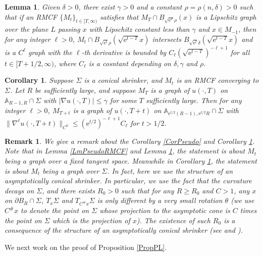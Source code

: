 \documentclass[12pt]{amsart}
\numberwithin{equation}{section}
\newtheorem{lemma}[theorem]{Lemma}
\newtheorem{remark}[theorem]{Remark}
\newtheorem{corollary}[theorem]{Corollary}
\numberwithin{equation}{section}
\begin{document}
	\begin{lemma}\label{LmPseudoRMCF-high}
		Given $\delta>0$, there exist $\gamma>0$ and a constant $\rho=\rho(n,\delta)>0$ such that if an RMCF $\{M_t\}_{t\in[T,\infty)}$ satisfies that $M_{T}\cap B_{\sqrt{\mathrm{e}^T}\rho}(x)$ is a Lipschitz graph over the plane $L$ passing $x$ with Lipschitz constant less than $\gamma$ and $x\in M_{-1}$, then for any integer $\ell>0$, $M_t \cap B_{\sqrt{\mathrm{e}^t}\rho}(\sqrt{\mathrm{e}^{t-T}}x)$ intersects $B_{\sqrt{\mathrm{e}^t}\delta}(\sqrt{\mathrm{e}^{t-T}}x)$ and is a $C^\ell$ graph with the $\ell$-th derivative is bounded by $C_\ell(\sqrt{\mathrm{e}^{t-T}})^{-\ell+1}$ for all $t\in[T+1/2,\infty)$, where $C_\ell$ is a cosntant depending on $\delta,\gamma$ and $\rho$.
	\end{lemma}
	\begin{corollary}\label{CorPseudo-high}
		Suppose $\Sigma$ is a conical shrinker, and $M_t$ is an RMCF converging to $\Sigma$. Let $R$ be sufficiently large, and suppose $M_T$ is a graph of $u(\cdot,T)$ on $\mathbb A_{R-1,R}\cap\Sigma$ with $|\nabla u(\cdot,T)|\leq \gamma$ for some   $T$ sufficiently large. Then for any integer $\ell>0$, $M_{T+t}$ is a graph of $u(\cdot,T+t)$ on $\mathbb A_{\mathrm{e}^{t/2} (R-1),\mathrm{e}^{t/2}R}\cap\Sigma$ with $\|\nabla^\ell u(\cdot,T+t)\|_{C^0}\leq (\mathrm{e}^{t/2})^{-\ell+1}C_\ell$ for $t>1/2$.
	\end{corollary}
	
	\begin{remark}
		We give a remark about the Corollary \ref{CorPseudo} and Corollary \ref{CorPseudo-high}. Note that in Lemma \ref{LmPseudoRMCF} and Lemma \ref{LmPseudoRMCF-high}, the statement is about $M_t$ being a graph over a fixed tangent space. Meanwhile in Corollary \ref{CorPseudo-high}, the statement is about $M_t$ being a graph over $\Sigma$. In fact, here we use the structure of an asymptotically conical shrinker. In particular, we use the fact that the curvature decays on $\Sigma$, and there exists $R_0>0$ such that for any $R\geq R_0$ and $C>1$, any $x$ on $\partial B_R\cap \Sigma$, $T_x\Sigma$ and $T_{C^\#x}\Sigma$ is only different by a very small rotation $\theta$ (we use $C^\# x$ to denote the point on $\Sigma$ whose projection to the asymptotic cone is $C$ times the point on $\Sigma$ which is the projection of $x$). The existence of such $R_0$ is a consequence of the structure of an asymptotically conical shrinker (see \cite{BW} and \cite{CS}). 
	\end{remark}
	We next work on the proof of Proposition \ref{PropPL}. 
	
\end{document}
